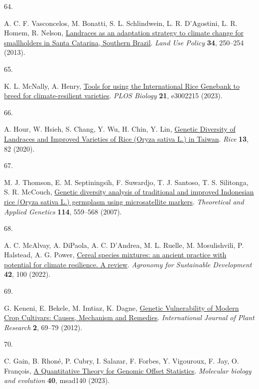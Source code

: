 \documentclass[
  letterpaper,
  DIV=11,
  numbers=noendperiod]{scrartcl}
\newlength{\cslhangindent}
\newlength{\csllabelwidth}
\newenvironment{CSLReferences}[2] %
 {\begin{list}{}{%
  \setlength{\itemindent}{0pt}
  \setlength{\leftmargin}{0pt}
  \setlength{\parsep}{0pt}
  \ifodd #1
   \setlength{\leftmargin}{\cslhangindent}
   \setlength{\itemindent}{-1\cslhangindent}
  \fi
  \setlength{\itemsep}{#2\baselineskip}}}
 {\end{list}}
\newcommand{\CSLLeftMargin}[1]{\parbox[t]{\csllabelwidth}{\strut#1\strut}}
\newcommand{\CSLRightInline}[1]{\parbox[t]{\linewidth - \csllabelwidth}{\strut#1\strut}}
\begin{document}
\begin{CSLReferences}{0}{1}
\CSLLeftMargin{64. }%
\CSLRightInline{A. C. F. Vasconcelos, M. Bonatti, S. L. Schlindwein, L.
R. D'Agostini, L. R. Homem, R. Nelson,
\href{https://doi.org/10.1016/j.landusepol.2013.03.017}{Landraces as an
adaptation strategy to climate change for smallholders in Santa
Catarina, Southern Brazil}. \emph{Land Use Policy} \textbf{34}, 250--254
(2013).}

\CSLLeftMargin{65. }%
\CSLRightInline{K. L. McNally, A. Henry,
\href{https://doi.org/10.1371/journal.pbio.3002215}{Tools for using the
International Rice Genebank to breed for climate-resilient varieties}.
\emph{PLOS Biology} \textbf{21}, e3002215 (2023).}

\CSLLeftMargin{66. }%
\CSLRightInline{A. Hour, W. Hsieh, S. Chang, Y. Wu, H. Chin, Y. Lin,
\href{https://doi.org/10.1186/s12284-020-00445-w}{Genetic Diversity of
Landraces and Improved Varieties of Rice (Oryza sativa L.) in Taiwan}.
\emph{Rice} \textbf{13}, 82 (2020).}

\CSLLeftMargin{67. }%
\CSLRightInline{M. J. Thomson, E. M. Septiningsih, F. Suwardjo, T. J.
Santoso, T. S. Silitonga, S. R. McCouch,
\href{https://doi.org/10.1007/s00122-006-0457-1}{Genetic diversity
analysis of traditional and improved Indonesian rice (Oryza sativa L.)
germplasm using microsatellite markers}. \emph{Theoretical and Applied
Genetics} \textbf{114}, 559--568 (2007).}

\CSLLeftMargin{68. }%
\CSLRightInline{A. C. McAlvay, A. DiPaola, A. C. D'Andrea, M. L. Ruelle,
M. Mosulishvili, P. Halstead, A. G. Power,
\href{https://doi.org/10.1007/s13593-022-00832-1}{Cereal species
mixtures: an ancient practice with potential for climate resilience. A
review}. \emph{Agronomy for Sustainable Development} \textbf{42}, 100
(2022).}

\CSLLeftMargin{69. }%
\CSLRightInline{G. Keneni, E. Bekele, M. Imtiaz, K. Dagne,
\href{https://doi.org/10.5923/j.plant.20120203.05}{Genetic Vulnerability
of Modern Crop Cultivars: Causes, Mechanism and Remedies}.
\emph{International Journal of Plant Research} \textbf{2}, 69--79
(2012).}

\CSLLeftMargin{70. }%
\CSLRightInline{C. Gain, B. Rhoné, P. Cubry, I. Salazar, F. Forbes, Y.
Vigouroux, F. Jay, O. François,
\href{https://doi.org/10.1093/molbev/msad140}{A Quantitative Theory for
Genomic Offset Statistics}. \emph{Molecular biology and evolution}
\textbf{40}, msad140 (2023).}


\end{CSLReferences}
\end{document}
